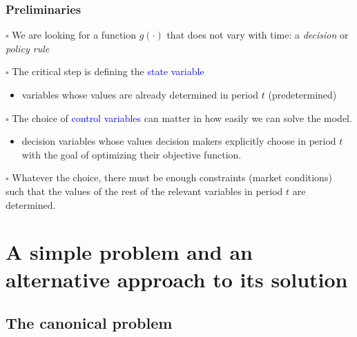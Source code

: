 \documentclass[10pt, handout]{beamer}
\begin{document}

\begin{frame}

\frametitle{Preliminaries} \vskip 0.1in


$\square$  We are looking for a function $g(\cdot)$ that does not vary with time: a \textit{decision} or \textit{policy rule} \vskip0.1in


$\square$ The critical step is defining the \textcolor{blue}{state variable} 
\begin{itemize}
\item variables whose values are already determined in period $t$ (predetermined)
\end{itemize} \vskip0.1in

$\square$ The choice of \textcolor{blue}{control variables} can matter in how easily we can solve the model. 
\begin{itemize}
\item decision variables whose values decision makers explicitly choose in period $t$ with the goal of optimizing their objective function.
\end{itemize} \vskip0.1in

$\square$ Whatever the choice, there must be enough constraints (market conditions) such that the values of the rest of the relevant variables in period $t$ are determined.

\end{frame}




\section{A simple problem and an alternative approach to its solution}


\subsection{The canonical problem}
\end{document}

